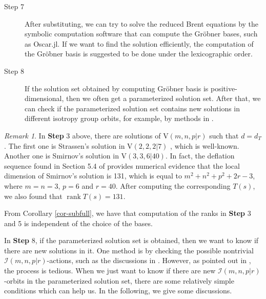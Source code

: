 \documentclass[reqno]{amsart}
\theoremstyle{definition}
\numberwithin{equation}{section}
\theoremstyle{remark}
\newtheorem{remark}[theorem]{Remark}
\newcounter{condition}
\begin{document}
\begin{description}
\item[Step 7]
After substituting, we can try to solve the reduced Brent equations by the symbolic computation software that can compute the Gröbner bases, such as Oscar.jl. If we want to find the solution efficiently, the computation of the Gröbner basis is suggested to be done under the lexicographic order.

\item[Step 8]
If the solution set obtained by computing Gröbner basis is positive-dimensional, then we often get a parameterized solution set. After that, we can check if the parameterized solution set contains new solutions in different isotropy group orbits, for example, by methods in \cite{berger22,Heule21,kaumoo22,Tichav-21}.
\end{description}

\begin{remark}
In \textbf{Step} 3 above, there are solutions of $\mathrm{V}(m,n,p|r)$ such that $d=d_T$. The first one is Strassen's solution in $\mathrm{V}(2,2,2|7)$ \cite{deGr78-2,Stra-69}, which is well-known. Another one is Smirnov's solution in $\mathrm{V}(3,3,6|40)$. In fact,
the deflation sequence found in Section 5.4 of \cite{li25def} provides numerical evidence that the local dimension of Smirnov's solution is 131, which is equal to $m^2+n^2+p^2+2r-3$, where $m=n=3$, $p=6$ and $r=40$. After computing the corresponding $T(s)$, we also found that $\operatorname{rank}T(s)=131$. 

From Corollary \ref{cor-subfull}, we have that computation of the ranks  in \textbf{Step} 3 and 5 is independent of the choice of the bases. 
\end{remark}

In \textbf{Step} 8, if the parameterized solution set is obtained, then we want to know if there are new solutions in it. One method is by checking the possible nontrivial $\mathcal{I}(m,n,p|r)$-actions, such as the discussions in \cite[Sect.3]{JohnMc86}. However, as pointed out in \cite{JohnMc86}, the process is tedious. When we just want to know if there are new $\mathcal{I}(m,n,p|r)$-orbits in the parameterized solution set, there are some relatively simple conditions which can help us. In the following, we give some discussions. 
\end{document}
